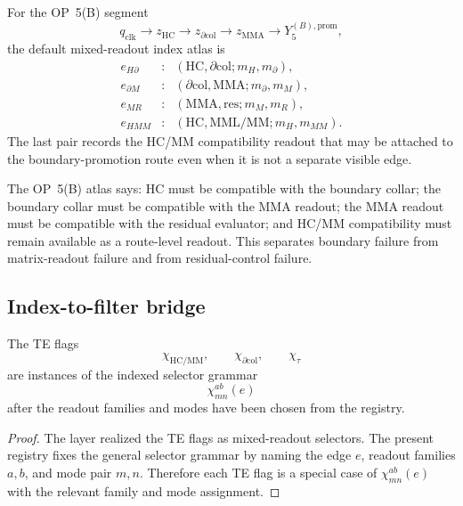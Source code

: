 \begin{definition}
\label{def:v410r19-op5b-mixed-readout-index-atlas}
For the OP~5(B) segment
\[
 q_{\mathrm{clk}}\to z_{\mathrm{HC}}\to z_{\partial\mathrm{col}}\to
 z_{\mathrm{MMA}}\to Y_5^{(B),\mathrm{prom}},
\]
the default mixed-readout index atlas is
\[
\begin{array}{ccl}
e_{H\partial} &:& (\mathrm{HC},\partial\mathrm{col};m_H,m_\partial),\\
e_{\partial M} &:& (\partial\mathrm{col},\mathrm{MMA};m_\partial,m_M),\\
e_{MR} &:& (\mathrm{MMA},\mathrm{res};m_M,m_R),\\
e_{HMM} &:& (\mathrm{HC},\mathrm{MML/MM};m_H,m_{MM}).
\end{array}
\]
The last pair records the HC/MM compatibility readout that may be attached to
the boundary-promotion route even when it is not a separate visible edge.
\end{definition}

\begin{remark}
\label{rem:v410r19-human-reading-op5b-atlas}
The OP~5(B) atlas says: HC must be compatible with the boundary collar;
the boundary collar must be compatible with the MMA readout; the MMA readout
must be compatible with the residual evaluator; and HC/MM compatibility must
remain available as a route-level readout. This separates boundary failure from
matrix-readout failure and from residual-control failure.
\end{remark}

\subsection{Index-to-filter bridge}
\label{subsec:v410r19-index-to-filter-bridge}

\begin{proposition}
\label{prop:v410r19-index-bridge-to-te-flags}
The TE flags
\[
 \chi_{\mathrm{HC/MM}},\qquad
 \chi_{\partial\mathrm{col}},\qquad
 \chi_{\tau}
\]
are instances of the indexed selector grammar
\[
 \chi^{ab}_{mn}(e)
\]
after the readout families and modes have been chosen from the registry.
\end{proposition}

\begin{proof}
The layer realized the TE flags as mixed-readout selectors. The present
registry fixes the general selector grammar by naming the edge \(e\), readout
families \(a,b\), and mode pair \(m,n\). Therefore each TE flag is a special
case of \(\chi^{ab}_{mn}(e)\) with the relevant family and mode assignment.
\end{proof}

